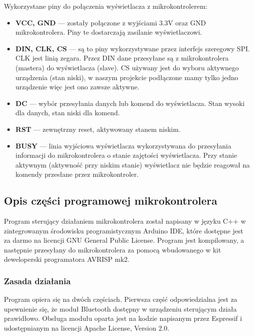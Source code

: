 \documentclass[a4paper,12pt, twoside]{article}
\begin{document}
        Wykorzystane piny do połączenia wyświetlacza z mikrokontrolerem: 
        \begin{itemize}
            \item \textbf{VCC, GND} — zostały połączone z wyjściami 3.3V oraz GND mikrokontrolera. Piny te dostarczają zasilanie wyświetlaczowi.
            \item \textbf{DIN, CLK, CS} — są to piny wykorzystywane przez interfejs szeregowy SPI. CLK jest linią zegara. Przez DIN dane przesyłane są z mikrokontrolera (mastera) do wyświetlacza (slave). CS używany jest do wyboru aktywnego urządzenia (stan niski), w naszym projekcie podłączone mamy tylko jedno urządzenie więc jest ono zawsze aktywne.
            \item \textbf{DC} — wybór przesyłania danych lub komend do wyświetlacza. Stan wysoki dla danych, stan niski dla komend.
            \item \textbf{RST} — zewnętrzny reset, aktywowany stanem niskim.
            \item \textbf{BUSY}  — linia wyjściowa wyświetlacza wykorzystywana do przesyłania informacji do mikrokontrolera o stanie zajętości wyświetlacza. Przy stanie aktywnym (aktywność przy niskim stanie) wyświetlacz nie będzie reagował na komendy przesłane przez mikrokontroler. 
        \end{itemize}
        
        \subsection{Opis części programowej mikrokontrolera}
    	Program sterujący działaniem mikrokontrolera został napisany w języku C++ w zintegrowanym środowisku programistycznym Arduino IDE, które dostępne jest za darmo na licencji GNU General Public License. Program jest kompilowany, a następnie przesyłany do mikrokontrolera za pomocą wbudowanego w kit deweloperski programatora AVRISP mk2.
   
    	\subsubsection{Zasada działania}

        Program opiera się na dwóch częściach. Pierwsza część odpowiedzialna jest za upewnienie się, że moduł Bluetooth dostępny w urządzeniu sterującym działa prawidłowo. Obsługa modułu oparta jest na kodzie napisanym przez Espressif i udostępnianym na licencji Apache License, Version 2.0.
\end{document}
